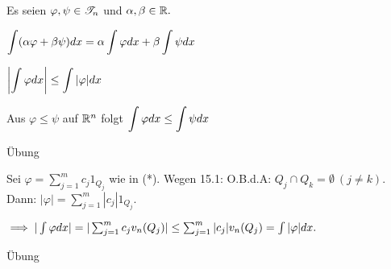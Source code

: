 \documentclass{article}
\begin{document}
\begin{satz}
Es seien $\varphi,\psi\in\mathscr{T}_n$ und $\alpha,\beta\in\mathbb{R}.$
\begin{liste}
\item $\displaystyle{\int(\alpha\varphi+\beta\psi)dx = \alpha\int\varphi dx+\beta\int\psi dx}$
\item $\displaystyle{\left|\int\varphi dx\right| \le \int|\varphi|dx}$
\item Aus $\varphi\le\psi$ auf $\mathbb{R}^n$ folgt $\displaystyle{\int\varphi dx \le \int\psi dx}$
\end{liste}
\end{satz}

\begin{beweise}
\item Übung
\item Sei $\varphi = \sum_{j=1}^m c_j1_{Q_j}$ wie in (*). Wegen 15.1: O.B.d.A: $Q_j\cap Q_k = \emptyset\ (j\ne k).$ Dann: $|\varphi| = \sum_{j=1}^m |c_j|1_{Q_j}.$

$\implies |\int\varphi dx| = |\sum_{j=1}^m c_jv_n(Q_j)| \le \sum_{j=1}^m |c_j|v_n(Q_j) = \int|\varphi|dx.$
\item Übung
\end{beweise}
\end{document}
